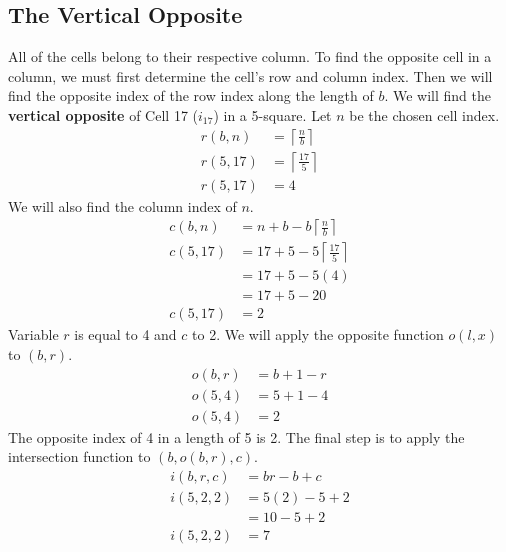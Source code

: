 \documentclass[letterpaper, twoside,12pt]{article}
\begin{document}
    \subsection{The Vertical Opposite} \label{vertical_opposite}
    All of the cells belong to their respective column. To find the opposite cell in a column, we must first determine the cell's row and column index. Then we will find the opposite index of the row index along the length of $b$. We will find the \textbf{vertical opposite} of Cell 17 ($i_{17}$) in a 5-square. Let $n$ be the chosen cell index.
    \begin{equation}
        \begin{split}
            r(b,n) &= \left\lceil \frac{n}{b}\right\rceil \\
            r(5,17) &= \left\lceil \frac{17}{5}\right\rceil \\
            r(5,17) &= 4
        \end{split}
    \end{equation}
    We will also find the column index of $n$.
    \begin{equation}
        \begin{split}
            c(b,n) &= n + b - b\left\lceil \frac{n}{b}\right\rceil \\
            c(5,17) &= 17 + 5 - 5\left\lceil \frac{17}{5}\right\rceil \\
                &= 17 + 5 - 5(4) \\
                &= 17 + 5 - 20 \\
            c(5,17) &= 2
        \end{split}
    \end{equation}
    Variable $r$ is equal to 4 and $c$ to 2. We will apply the opposite function $o(l,x)$ to $(b,r)$.
    \begin{equation}
        \begin{split}
            o(b,r) &= b + 1 - r \\
            o(5,4) &= 5 + 1 - 4 \\
            o(5,4) &= 2
        \end{split}
    \end{equation}
    The opposite index of 4 in a length of 5 is 2. The final step is to apply the intersection function to $(b,o(b,r),c)$.
    \begin{equation}
        \begin{split}
            i(b,r,c) &= br - b + c \\
            i(5,2,2) &= 5(2) - 5 + 2 \\
                &= 10 - 5 + 2 \\
            i(5,2,2) &= 7 \\
        \end{split}
    \end{equation}
\end{document}
